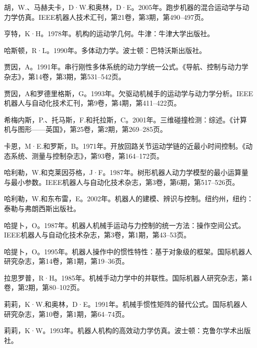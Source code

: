 \documentclass[10pt,a4paper]{book}
\theoremstyle{thmstyle} %
\theoremstyle{defstyle} %
\theoremstyle{prostyle} %
\begin{document}
胡，W.、马赫夫卡，D·W.和奥林，D·E。2005年。跑步机器的混合运动学与动力学仿真。IEEE机器人技术汇刊，第21卷，第3期，第490–497页。



亨特，K·H。1978年。机构的运动学几何。牛津：牛津大学出版社。



哈斯顿，R·L。1990年。多体动力学。波士顿：巴特沃斯出版社。



贾因，A。1991年。串行刚性多体系统的动力学统一公式。《导航、控制与动力学杂志》，第14卷，第3期，第531–542页。



贾因，A和罗德里格斯，G。1993年。欠驱动机械手的运动学与动力学分析。IEEE机器人与自动化技术汇刊，第9卷，第4期，第411–422页。



希梅内斯，P.、托马斯，F.和托拉斯，C。2001年。三维碰撞检测：综述。《计算机与图形——英国》，第25卷，第2期，第269–285页。



卡恩，M·E.和罗斯，B。1971年。开放回路关节运动学链的近最小时间控制。《动态系统、测量与控制杂志》，第93卷，第164–172页。



哈利勒，W.和克莱因芬格，J·F。1987年。树形机器人动力学模型的最小运算量与最小参数。IEEE机器人与自动化技术杂志，第3卷，第6期，第517–526页。



哈利勒，W.和东布雷，E。2002年。机器人的建模、辨识与控制。纽约州，纽约：泰勒与弗朗西斯出版社。



哈提卜，O。1987年。机器人机械手运动与力控制的统一方法：操作空间公式。IEEE机器人与自动化技术杂志，第3卷，第1期，第43–53页。



哈提卜，O。1995年。机器人操作中的惯性特性：基于对象级的框架。国际机器人研究杂志，第14卷，第1期，第19–36页。



拉思罗普，R·H。1985年。机械手动力学中的并联性。国际机器人研究杂志，第4卷，第2期，第80–102页。



莉莉，K·W.和奥林，D·E。1991年。机械手惯性矩阵的替代公式。国际机器人研究杂志，第10卷，第1期，第64–74页。



莉莉，K·W。1993年。机器人机构的高效动力学仿真。波士顿：克鲁尔学术出版社。
\end{document}
